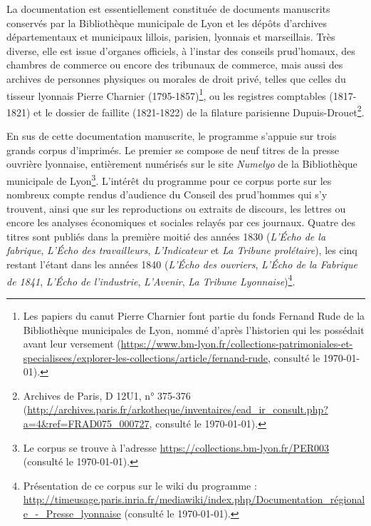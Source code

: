 La documentation est essentiellement constituée de documents manuscrits conservés par la Bibliothèque municipale de Lyon et les dépôts d'archives départementaux et municipaux lillois, parisien, lyonnais et marseillais. Très diverse, elle est issue d'organes officiels, à l'instar des conseils prud'homaux, des chambres de commerce ou encore des tribunaux de commerce, mais aussi des archives de personnes physiques ou morales de droit privé, telles que celles du tisseur lyonnais Pierre Charnier (1795-1857)\footnote{Les papiers du canut Pierre Charnier font partie du fonds \og Fernand Rude \fg{} de la Bibliothèque municipales de Lyon, nommé d'après l'historien qui les possédait avant leur versement (\url{https://www.bm-lyon.fr/collections-patrimoniales-et-specialisees/explorer-les-collections/article/fernand-rude}, consulté le \today).}, ou les registres comptables (1817-1821) et le dossier de faillite (1821-1822) de la filature parisienne Dupuis-Drouet\footnote{Archives de Paris, D 12U1, n° 375-376 (\url{http://archives.paris.fr/arkotheque/inventaires/ead_ir_consult.php?a=4&ref=FRAD075_000727}, consulté le \today).}.

En sus de cette documentation manuscrite, le programme \timeus{} s'appuie sur trois grands corpus d'imprimés. Le premier se compose de neuf titres de la presse ouvrière lyonnaise, entièrement numérisés sur le site \textit{Numelyo} de la Bibliothèque municipale de  Lyon\footnote{Le corpus se trouve à l'adresse \url{https://collections.bm-lyon.fr/PER003} (consulté le \today).}. L'intérêt du programme pour ce corpus porte sur les nombreux compte rendus d'audience du Conseil des prud'hommes qui s'y trouvent, ainsi que sur les reproductions ou extraits de discours, les lettres ou encore les analyses économiques et sociales relayés par ces journaux. Quatre des titres sont publiés dans la première moitié des années 1830 (\textit{L'Écho de la fabrique}, \textit{L’Écho des travailleurs}, \textit{L'Indicateur} et \textit{La Tribune prolétaire}), les cinq restant l'étant dans les années 1840 (\textit{L’Écho des ouvriers}, \textit{L’Écho de la Fabrique de 1841}, \textit{L’Écho de l'industrie}, \textit{L'Avenir}, \textit{La Tribune Lyonnaise})\footnote{Présentation de ce corpus sur le wiki du programme : \url{http://timeusage.paris.inria.fr/mediawiki/index.php/Documentation_régionale_-_Presse_lyonnaise} (consulté le \today).}.

